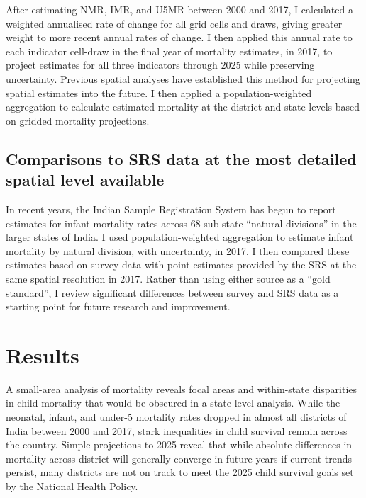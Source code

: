 \documentclass[
]{report}
\begin{document}
After estimating NMR, IMR, and U5MR between 2000 and 2017, I calculated a weighted annualised rate of change for all grid cells and draws, giving greater weight to more recent annual rates of change. I then applied this annual rate to each indicator cell-draw in the final year of mortality estimates, in 2017, to project estimates for all three indicators through 2025 while preserving uncertainty. Previous spatial analyses have established this method for projecting spatial estimates into the future.\autocite{Osgood-Zimmerman2018} I then applied a population-weighted aggregation to calculate estimated mortality at the district and state levels based on gridded mortality projections.

\hypertarget{comparisons-to-srs-data-at-the-most-detailed-spatial-level-available}{%
\subsection{Comparisons to SRS data at the most detailed spatial level available}\label{comparisons-to-srs-data-at-the-most-detailed-spatial-level-available}}

In recent years, the Indian Sample Registration System has begun to report estimates for infant mortality rates across 68 sub-state ``natural divisions'' in the larger states of India.\autocite{CensusofIndia2017} I used population-weighted aggregation to estimate infant mortality by natural division, with uncertainty, in 2017. I then compared these estimates based on survey data with point estimates provided by the SRS at the same spatial resolution in 2017. Rather than using either source as a ``gold standard'', I review significant differences between survey and SRS data as a starting point for future research and improvement.

\hypertarget{results-2}{%
\section{Results}\label{results-2}}

A small-area analysis of mortality reveals focal areas and within-state disparities in child mortality that would be obscured in a state-level analysis. While the neonatal, infant, and under-5 mortality rates dropped in almost all districts of India between 2000 and 2017, stark inequalities in child survival remain across the country. Simple projections to 2025 reveal that while absolute differences in mortality across district will generally converge in future years if current trends persist, many districts are not on track to meet the 2025 child survival goals set by the National Health Policy.\autocite{IND_MOHFW2017}
\end{document}
